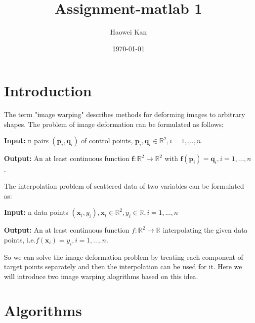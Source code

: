 \documentclass[12pt]{article}
\begin{document}
\title {Assignment-matlab 1}
\date{\today}
\author{Haowei Kan}
\maketitle
\section{Introduction}
The term "image warping" describes methods for deforming images to arbitrary shapes. The problem of image deformation can be formulated as follows:

{\bf Input:} n pairs $(\mathbf{p}_i,\mathbf{q}_i) $ of control points, $\mathbf{p}_i,\mathbf{q}_i\in \mathbb{R}^2, i = 1,...,n $.

{\bf Output:} An at least continuous function $\mathbf{f}:\mathbb{R}^2\rightarrow\mathbb{R}^2$ with $\mathbf{f}(\mathbf{p}_i)=\mathbf{q}_i,i = 1,...,n$.

\noindent The interpolation problem of scattered data of two variables can be formulated as:

{\bf Input:} n data points $(\mathbf{x}_i,y_i),\mathbf{x}_i\in\mathbb{R}^2,y_i\in\mathbb{R},i=1,...,n$

{\bf Output:} An at least continuous function $f:\mathbb{R}^2\rightarrow\mathbb{R}$ interpolating the given data points, i.e.$f(\mathbf{x}_i)=y_i, i=1,...,n$.

\noindent So we can solve the image deformation problem by treating each component of target points separately and then the interpolation can be used for it. Here we will introduce two image warping alogrithms based on this idea.


\section{Algorithms}
\end{document}
